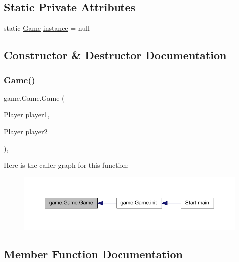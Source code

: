 \subsection*{Static Private Attributes}
\begin{DoxyCompactItemize}
\item 
static \mbox{\hyperlink{classgame_1_1_game}{Game}} \mbox{\hyperlink{classgame_1_1_game_a0f4a2a874f2888e9c7f86bd123b3c093}{instance}} = null
\end{DoxyCompactItemize}


\subsection{Constructor \& Destructor Documentation}
\mbox{\label{classgame_1_1_game_aa7ac6d17ad9e5c24164d50f958c01f13}} 
\subsubsection{\texorpdfstring{Game()}{Game()}}
{\footnotesize\ttfamily game.\+Game.\+Game (\begin{DoxyParamCaption}\item[{\mbox{\hyperlink{interfaceplayer_1_1_player}{Player}}}]{player1,  }\item[{\mbox{\hyperlink{interfaceplayer_1_1_player}{Player}}}]{player2 }\end{DoxyParamCaption})\hspace{0.3cm}{\ttfamily [inline]}, {\ttfamily [private]}}

Here is the caller graph for this function\+:
\nopagebreak
\begin{figure}[H]
\begin{center}
\leavevmode
\includegraphics[width=350pt]{classgame_1_1_game_aa7ac6d17ad9e5c24164d50f958c01f13_icgraph}
\end{center}
\end{figure}


\subsection{Member Function Documentation}
\mbox{\label{classgame_1_1_game_a21ddf7c79b79b1fd7e433082107fdeaa}} 
